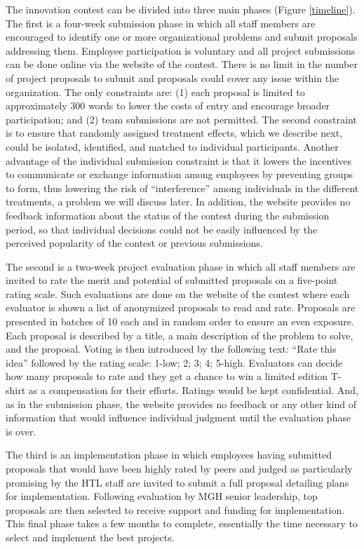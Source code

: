 \documentclass[11pt]{article}
\begin{document}
The innovation contest can be divided into three main phases (Figure
\ref{timeline}). The first is a four-week submission phase in which all
staff members are encouraged to identify one or more organizational
problems and submit proposals addressing them. Employee participation is
voluntary and all project submissions can be done online via the website
of the contest. There is no limit in the number of project proposals to
submit and proposals could cover any issue within the organization. The
only constraints are: (1) each proposal is limited to approximately 300
words to lower the costs of entry and encourage broader participation;
and (2) team submissions are not permitted. The second constraint is to
ensure that randomly assigned treatment effects, which we describe next,
could be isolated, identified, and matched to individual participants.
Another advantage of the individual submission constraint is that it
lowers the incentives to communicate or exchange information among
employees by preventing groups to form, thus lowering the risk of
``interference'' among individuals in the different treatments, a
problem we will discuss later. In addition, the website provides no
feedback information about the status of the contest during the
submission period, so that individual decisions could not be easily
influenced by the perceived popularity of the contest or previous
submissions.

The second is a two-week project evaluation phase in which all staff
members are invited to rate the merit and potential of submitted
proposals on a five-point rating scale. Such evaluations are done on the
website of the contest where each evaluator is shown a list of
anonymized proposals to read and rate. Proposals are presented in
batches of 10 each and in random order to ensure an even exposure. Each
proposal is described by a title, a main description of the problem to
solve, and the proposal. Voting is then introduced by the following
text: ``Rate this idea'' followed by the rating scale: 1-low; 2; 3; 4;
5-high. Evaluators can decide how many proposals to rate and they get a
chance to win a limited edition T-shirt as a compensation for their
efforts. Ratings would be kept confidential. And, as in the submission
phase, the website provides no feedback or any other kind of information
that would influence individual judgment until the evaluation phase is
over.

The third is an implementation phase in which employees having submitted
proposals that would have been highly rated by peers and judged as
particularly promising by the HTL staff are invited to submit a full
proposal detailing plans for implementation. Following evaluation by MGH
senior leadership, top proposals are then selected to receive support
and funding for implementation. This final phase takes a few months to
complete, essentially the time necessary to select and implement the
best projects.
\end{document}

